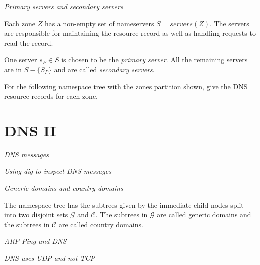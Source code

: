 \frmrule 

\textit{Primary servers and secondary servers}

Each zone $Z$ has a non-empty set of nameservers $S = servers(Z)$. 
The servers are responsible for maintaining the resource record as well as 
handling requests to read the record. 

One server $s_P \in S$ is chosen to be the \textit{primary server}. 
All the remaining servers are in $S - \{S_P\}$ and are called \textit{secondary servers}. 




\frmrule 



\frmrule 

\begin{example}
For the following namespace tree with the zones partition shown, 
give the DNS resource records for each zone. 
\end{example}

\frmrule 



\section{DNS II}


\frmrule 

\textit{DNS messages}


\frmrule 

\textit{Using dig to inspect DNS messages}


\frmrule 

\textit{Generic domains and country domains}

The namespace tree has the subtrees
given by the immediate child nodes 
split into two disjoint sets $\mathcal{G}$ and $\mathcal{C}$. 
The subtrees in $\mathcal{G}$ are called generic domains 
and the subtrees in $\mathcal{C}$ are called country domains. 


\frmrule 

\textit{ARP Ping and DNS}


\frmrule 

\textit{DNS uses UDP and not TCP}

